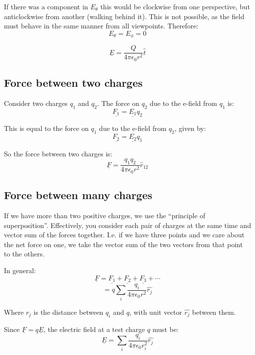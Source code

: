 If there was a component in $E_\theta$ this would be clockwise from one perspective, but anticlockwise from another (walking behind it). This is not possible, as the field must behave in the same manner from all viewpoints. Therefore:
\[
    E_\theta = E_\phi = 0
\]

\[
    \underline{E} = \frac{Q}{4 \pi \epsilon_0 r^2} \hat{t}
\]

\subsection{Force between two charges}
Consider two charges $q_1$ and $q_2$. The force on $q_2$ due to the e-field from $q_1$ is:
\[
    \underline{F_1} = \underline{E_1} q_2
\]

This is equal to the force on $q_1$ due to the e-field from $q_2$, given by:
\[
    \underline{F_2} = \underline{E_2} q_1
\]

So the force between two charges is:
\[
    \underline{F} = \frac{q_1 q_2}{4 \pi \epsilon_0 r^2} \hat{r}_{12}
\]

\subsection{Force between many charges}
If we have more than two positive charges, we use the ``principle of superposition''. Effectively, you consider each pair of charges at the same time and vector sum of the forces together. I.e. if we have three points and we care about the net force on one, we take the vector sum of the two vectors from that point to the others.

In general:
\[
    \underline{F} = \underline{F_1} + \underline{F_2} + \underline{F_3} + \cdots
\]
\[
    = q \sum_{i}\frac{q_i}{4 \pi \epsilon_0 r^2} \hat{r_j}
\]

Where $r_j$ is the distance between $q_i$ and $q$, with unit vector $\hat{r_j}$ between them.

Since $\underline{F} = q \underline{E}$, the electric field at a test charge $q$ must be:
\[
    \underline{E} = \sum_{i} \frac{q_i}{4 \pi \epsilon_0 r_i^2} \hat{r_j}
\]